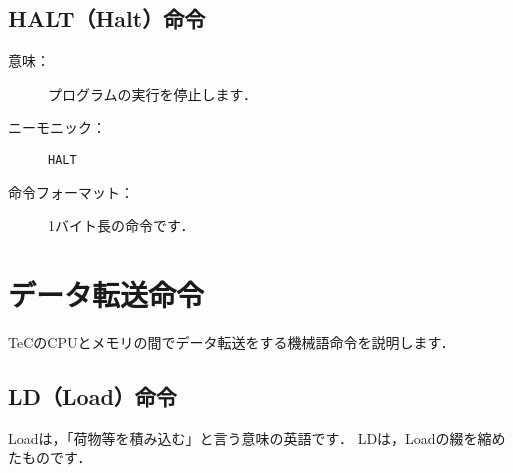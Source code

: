 \subsection{HALT（Halt）命令}
\begin{description}
\item[意味：]プログラムの実行を停止します．

\item[ニーモニック：]{\tt HALT}

\item[命令フォーマット：]1バイト長の命令です．


\end{description}

\newpage
\section{データ転送命令}
TeCのCPUとメモリの間でデータ転送をする機械語命令を説明します．

\subsection{LD（Load）命令}
Loadは，「荷物等を積み込む」と言う意味の英語です．
LDは，Loadの綴を縮めたものです．

